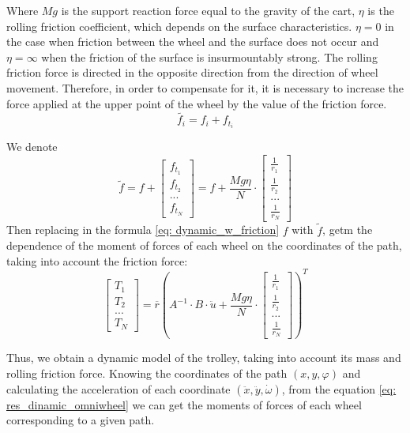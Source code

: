 \documentclass[oneside,final,14pt]{extreport}
\begin{document}
Where $ Mg $ is the support reaction force equal to the gravity of the cart, $ \eta $ is the rolling friction coefficient, which depends on the surface characteristics. $ \eta = 0 $ in the case when friction between the wheel and the surface does not occur and $ \eta = \infty $ when the friction of the surface is insurmountably strong.
The rolling friction force is directed in the opposite direction from the direction of wheel movement. Therefore, in order to compensate for it, it is necessary to increase the force applied at the upper point of the wheel by the value of the friction force.
\begin{equation}
\tilde{f_{i}}
=
f_{i}
+
f_{t_{i}}
\end{equation}

We denote
\begin{equation}
\tilde{f}
=
f
+
\begin{bmatrix}
f_{t_{1}} \\
f_{t_{2}} \\
... \\
f_{t_{N}}
\end{bmatrix}
=
f
+
\frac{Mg \eta}{N}
\cdot
\begin{bmatrix}
\frac{1}{r_{1}} \\
\frac{1}{r_{2}} \\
... \\
\frac{1}{r_{N}}
\end{bmatrix}
\end{equation}
Then replacing in the formula \ref{eq: dynamic_w_friction} $ f $ with $ \tilde{f} $, getm the dependence of the moment of forces of each wheel on the coordinates of the path, taking into account the friction force:
\begin{equation}
\label{eq: res_dinamic_omniwheel}
\begin{bmatrix}
T_{1} \\
T_{2} \\
... \\
T_{N}
\end{bmatrix}
=
\overline{r}
(
A ^{- 1}
\cdot
B
\cdot
\ddot{u}
+
\frac{Mg \eta}{N}
\cdot
\begin{bmatrix}
\frac{1}{r_{1}} \\
\frac{1}{r_{2}} \\
... \\
\frac{1}{r_{N}}
\end{bmatrix}
) ^{T}
\end{equation}

Thus, we obtain a dynamic model of the trolley, taking into account its mass and rolling friction force. Knowing the coordinates of the path $ (x, y, \varphi) $ and calculating the acceleration of each coordinate $ (\ddot{x}, \ddot{y}, \dot{\omega}) $, from the equation \ref{eq: res_dinamic_omniwheel} we can get the moments of forces of each wheel corresponding to a given path.
\end{document}

